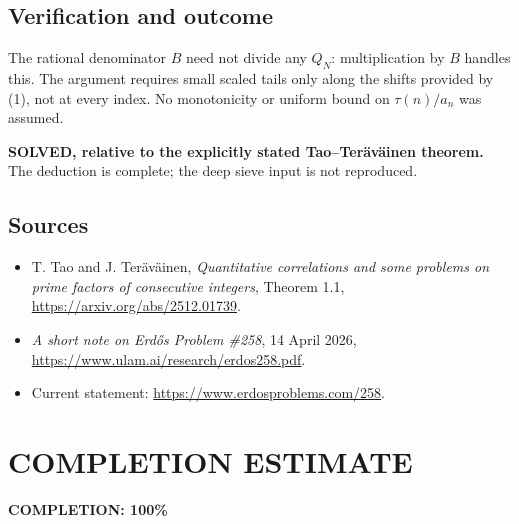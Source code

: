 \subsection{Verification and outcome}
The rational denominator $B$ need not divide any $Q_N$: multiplication by $B$ handles this. The argument requires small scaled tails only along the shifts provided by (1), not at every index. No monotonicity or uniform bound on $\tau(n)/a_n$ was assumed.

\textbf{SOLVED, relative to the explicitly stated Tao--Ter\"av\"ainen theorem.} The deduction is complete; the deep sieve input is not reproduced.

\subsection{Sources}
\begin{itemize}
\item T. Tao and J. Ter\"av\"ainen, \emph{Quantitative correlations and some problems on prime factors of consecutive integers}, Theorem 1.1, \url{https://arxiv.org/abs/2512.01739}.
\item \emph{A short note on Erd\H{o}s Problem \#258}, 14 April 2026, \url{https://www.ulam.ai/research/erdos258.pdf}.
\item Current statement: \url{https://www.erdosproblems.com/258}.
\end{itemize}
\section{COMPLETION ESTIMATE}
\textbf{COMPLETION: 100\%}
